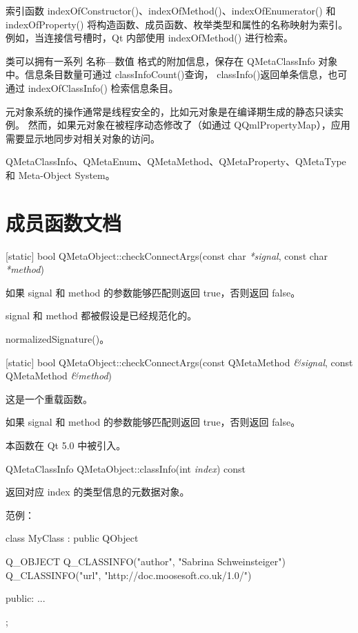 索引函数 indexOfConstructor()、indexOfMethod()、indexOfEnumerator() 和 indexOfProperty() 将构造函数、成员函数、枚举类型和属性的名称映射为索引。例如，当连接信号槽时，Qt 内部使用 indexOfMethod() 进行检索。

类可以拥有一系列 名称—数值 格式的附加信息，保存在 QMetaClassInfo 对象中。信息条目数量可通过 classInfoCount()查询， classInfo()返回单条信息，也可通过 indexOfClassInfo() 检索信息条目。

\begin{notice}
元对象系统的操作通常是线程安全的，比如元对象是在编译期生成的静态只读实例。
然而，如果元对象在被程序动态修改了（如通过 QQmlPropertyMap），应用需要显示地同步对相关对象的访问。
\end{notice}

\begin{seeAlso}
QMetaClassInfo、QMetaEnum、QMetaMethod、QMetaProperty、QMetaType 和 Meta-Object System。
\end{seeAlso}

\section{成员函数文档}

[static] bool QMetaObject::checkConnectArgs(const char \emph{*signal}, const char \emph{*method})

如果 signal 和 method 的参数能够匹配则返回 true，否则返回 false。

signal 和 method 都被假设是已经规范化的。

\begin{seeAlso}
normalizedSignature()。
\end{seeAlso}

[static] bool QMetaObject::checkConnectArgs(const QMetaMethod \emph{\&signal}, const QMetaMethod \emph{\&method})

这是一个重载函数。

如果 signal 和 method 的参数能够匹配则返回 true，否则返回 false。

本函数在 Qt 5.0 中被引入。

QMetaClassInfo QMetaObject::classInfo(int \emph{index}) const

返回对应 index 的类型信息的元数据对象。

范例：

\begin{cppcode}
class MyClass : public QObject
 {
     Q_OBJECT
     Q_CLASSINFO("author", "Sabrina Schweinsteiger")
     Q_CLASSINFO("url", "http://doc.moosesoft.co.uk/1.0/")

 public:
     ...
 };
\end{cppcode}


